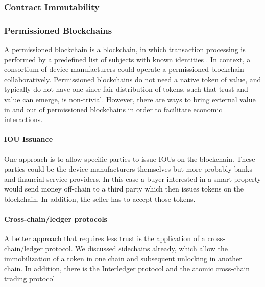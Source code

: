 \subsubsection{Contract Immutability}

\subsubsection{Permissioned Blockchains}

A permissioned blockchain is a blockchain, in which transaction processing is performed
by a predefined list of subjects with known identities \cite{BitFuryPermissioned2015}. In context, a consortium of device manufacturers could operate a permissioned blockchain collaboratively. Permissioned blockchains do not need a native token of value, and typically do not have one since fair distribution of tokens, such that trust and value can emerge, is non-trivial. However, there are ways to bring external value in and out of permissioned blockchains in order to facilitate economic interactions. 
\paragraph{IOU Issuance}
One approach is to allow specific parties to issue IOUs on the blockchain. These parties could be the device manufacturers themselves but more probably banks and financial service providers. In this case a buyer interested in a smart property would send money off-chain to a third party which then issues tokens on the blockchain. In addition, the seller has to accept those tokens. 

\paragraph{Cross-chain/ledger protocols}
A better approach that requires less trust is the application of a cross-chain/ledger protocol. We discussed sidechains already, which allow the immobilization of a token in one chain and subsequent unlocking in another chain. In addition, there is the Interledger protocol \cite{hope2016interledger} and the atomic cross-chain trading protocol \cite{atomiccrosschaintrading}
